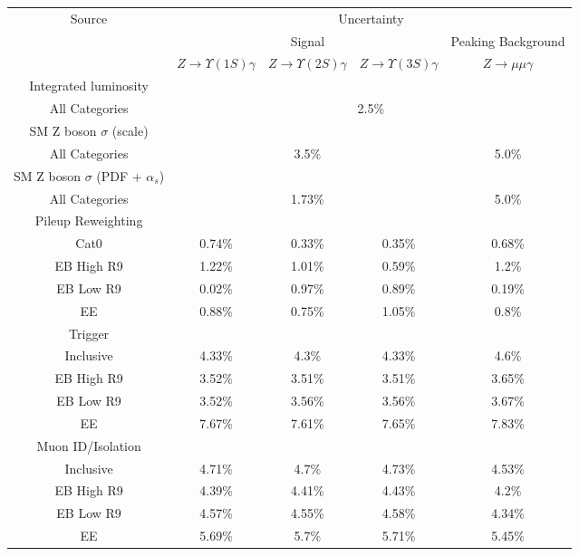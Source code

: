 
\begin{tabular}{c|c|c|c|c}
\cline{1-5}
\multirow{3}{*}{Source} & \multicolumn{4}{c}{Uncertainty} \\
\cline{2-5}
& \multicolumn{3}{c|}{Signal} & Peaking Background   \\
\cline{2-5}
& $Z \rightarrow \Upsilon(1S)  \gamma$ & $Z \rightarrow \Upsilon(2S)  \gamma$ & $Z \rightarrow \Upsilon(3S)  \gamma$ & $Z \rightarrow \mu\mu\gamma$  \\
\hline\hline
Integrated luminosity & \multicolumn{4}{l}{} \\ \hline
All Categories & \multicolumn{4}{c}{2.5\%} \\
\hline\hline
SM Z boson $\sigma$ (scale) & \multicolumn{4}{l}{} \\ \hline
All Categories & \multicolumn{3}{c|}{3.5\%}  & \multicolumn{1}{c}{5.0\%} \\
\hline\hline
SM Z boson $\sigma$ (PDF + $\alpha_s$)  & \multicolumn{4}{l}{} \\ \hline
All Categories & \multicolumn{3}{c|}{1.73\%}  & \multicolumn{1}{c}{5.0\%} \\
\hline\hline
Pileup Reweighting  & \multicolumn{4}{l}{} \\ \hline
Cat0 & 0.74\% & 0.33\% & 0.35\% & 0.68\% \\
EB High R9 & 1.22\% & 1.01\% & 0.59\% & 1.2\% \\
EB Low R9 & 0.02\% & 0.97\% & 0.89\% & 0.19\% \\
EE & 0.88\% & 0.75\% & 1.05\% & 0.8\% \\
\hline\hline
Trigger  & \multicolumn{4}{l}{} \\ \hline
Inclusive & 4.33\% & 4.3\% & 4.33\% & 4.6\% \\
EB High R9 & 3.52\% & 3.51\% & 3.51\% & 3.65\% \\
EB Low R9 & 3.52\% & 3.56\% & 3.56\% & 3.67\% \\
EE & 7.67\% & 7.61\% & 7.65\% & 7.83\% \\
\hline\hline
Muon ID/Isolation & \multicolumn{4}{l}{} \\ \hline
Inclusive & 4.71\% & 4.7\% & 4.73\% & 4.53\% \\
EB High R9 & 4.39\% & 4.41\% & 4.43\% & 4.2\% \\
EB Low R9 & 4.57\% & 4.55\% & 4.58\% & 4.34\% \\
EE & 5.69\% & 5.7\% & 5.71\% & 5.45\% \\

\end{tabular}
